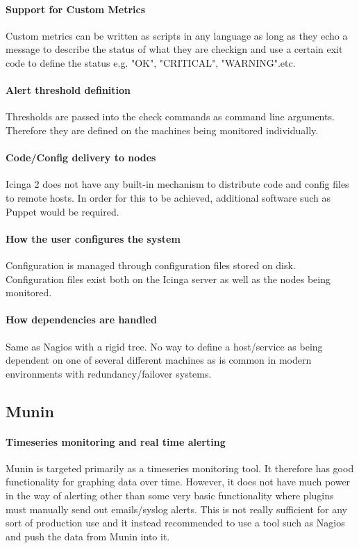 \documentclass[bsc,logo,twoside]{infthesis}
\begin{document}
\paragraph*{Support for Custom Metrics}
Custom metrics can be written as scripts in any language as long as they echo a message to describe
the status of what they are checkign and use a certain exit code to define the status e.g. "OK",
"CRITICAL", "WARNING".etc.

\paragraph*{Alert threshold definition}
Thresholds are passed into the check commands as command line arguments.  Therefore they are defined
on the machines being monitored individually.

\paragraph*{Code/Config delivery to nodes}
Icinga 2 does not have any built-in mechanism to distribute code and config files to remote hosts.
In order for this to be achieved, additional software such as Puppet would be required.

\paragraph*{How the user configures the system}
Configuration is managed through configuration files stored on disk.  Configuration files exist both
on the Icinga server as well as the nodes being monitored.

\paragraph*{How dependencies are handled}
Same as Nagios with a rigid tree.  No way to define a host/service as being dependent on one of 
several different machines as is common in modern environments with redundancy/failover systems.

\subsection{Munin}
\paragraph*{Timeseries monitoring and real time alerting}
Munin is targeted primarily as a timeseries monitoring tool.  It therefore has good functionality for
graphing data over time.  However, it does not have much power in the way of alerting other than some
very basic functionality where plugins must manually send out emails/syslog alerts.  This is not
really sufficient for any sort of production use and it instead recommended to use a tool such as
Nagios and push the data from Munin into it.
\end{document}
